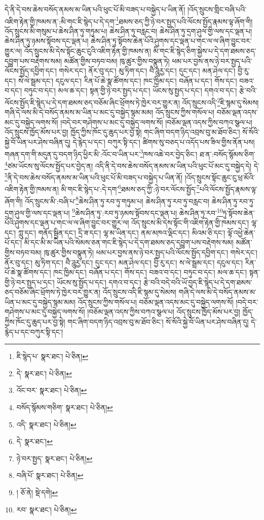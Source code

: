 དེ་ནི་དེ་བས་ཆེས་བསོད་ནམས་མ་ཡིན་པའི་ཕུང་པོ་མི་བཟད་པ་བསྐྱེད་པ་ཡིན་ནོ། །འོད་སྲུངས་གླིང་བཞི་པའི་འཇིག་རྟེན་གྱི་ཁམས་ན་:མི་གང་ཇི་སྙེད་པ་དེ་དག་\footnote{ཇི་སྙེད་པ་  སྣར་ཐང་།  པེ་ཅིན། }ཐམས་ཅད་ཀྱི་ཉེ་བར་སྤྱད་པའི་ལོངས་སྤྱོད་རྣམས་ལྟ་ཞོག་གི། འོད་སྲུངས་མི་གསུམ་པ་ཆེས་ཤིན་ཏུ་གཏུམ་པ། ཆེས་ཤིན་ཏུ་བརླང་བ། ཆེས་ཤིན་ཏུ་དྲག་ཤུལ་གྱི་ལས་དང་ལྡན་པ། ཆེས་ཤིན་ཏུ་ཉམས་སྟོབས་དང་ལྡན་པ། ཆེས་ཤིན་ཏུ་སྟོབས་ཆེན་པོའི་ཤུགས་དང་ལྡན་པ་གང་ལ་ལ་ཞིག་བྱུང་བར་གྱུར་ལ། འོད་སྲུངས་མི་དེས་སྟོང་ཆུང་ངུའི་འཇིག་རྟེན་གྱི་ཁམས་ན། མི་གང་ཇི་སྙེད་ཅིག་སྐྱེས་པ་དེ་དག་ཐམས་ཅད་དབྱུག་པས་བརྡེགས་སམ། མཚོན་གྱིས་བཏབ་བམ། ཁུ་ཚུར་གྱིས་བསྣུན་ཏེ། ཕམ་པར་བྱས་ནས་ཉེ་བར་སྤྱད་པའི་ལོངས་སྤྱོད་དབྱིག་དང་། གསེར་དང་། ནོར་བུ་དང་། མུ་ཏིག་དང་། བཻ་ཌཱུརྱ་དང་། དུང་དང་། མན་ཤེལ་དང་། བྱི་རུ་དང་། སེ་ལེ་སྦྲམ་དང་། དངུལ་དང་། རིན་པོ་ཆེ་སྣ་ཚོགས་དང་། ཁང་ཁྱིམ་དང་། བཞོན་པ་དང་། གོས་དང་། བཟའ་བ་དང་། བཏུང་བ་དང་། མལ་ཆ་དང་། སྟན་གྱི་ཉེ་བར་སྤྱད་པ་དང་། ཡོངས་སུ་སྤྱད་པ་དང་། དགའ་བ་དང་། རྩེ་བའི་ལོངས་སྤྱོད་ཇི་སྙེད་པ་དེ་དག་ཐམས་ཅད་བཅོམ་ཞིང་ཕྲོགས་ཏེ་ཁྱེར་བར་གྱུར་ན། འོད་སྲུངས་འདི་\footnote{དེ་  སྣར་ཐང་།  པེ་ཅིན། }ཇི་སྙམ་དུ་སེམས། གཞི་དེ་ལས་མི་དེ་བསོད་ནམས་མ་ཡིན་པ་མང་དུ་བསྐྱེད་སྙམ་མམ། འོད་སྲུངས་ཀྱིས་གསོལ་པ། བཅོམ་ལྡན་འདས་མང་དུ་བསྐྱེད་ལགས་སོ། །བདེ་བར་གཤེགས་པ་མང་དུ་བསྐྱེད་ལགས་སོ། །བཅོམ་ལྡན་འདས་ཀྱིས་བཀའ་སྩལ་པ། འོད་སྲུངས་ཁྱོད་མོས་པར་བྱ། ཁྱོད་ཀྱིས་ཁོང་དུ་ཆུད་པར་བྱ་སྟེ། གང་ཞིག་བདག་ཉིད་འབྲས་བུ་མ་ཐོབ་ཅིང་། སོ་སོའི་སྐྱེ་བོ་ཡིན་པར་ཤེས་བཞིན་དུ། དེ་རྙེད་པ་དང་། བཀུར་སྟི་དང་། ཚིགས་སུ་བཅད་པ་འདོད་པས་ཟིལ་གྱིས་ནོན་པས། གཞན་དག་གི་མདུན་དུ་བདག་ཉིད་ཕྱིར་མི་:འོང་བ་ཡིན་པར་\footnote{འོང་བར་  སྣར་ཐང་།  པེ་ཅིན། }ཁས་འཆེ་བར་བྱེད་ཅིང་། ཐ་ན་:བསོད་སྙོམས་ཅིག་\footnote{བསོད་སྙོམས་གཅིག་  སྣར་ཐང་།  པེ་ཅིན། }ཙམ་ཡོངས་སུ་ལོངས་སྤྱོད་པར་བྱེད་ན། འདི་ནི་དེ་བས་ཆེས་བསོད་ནམས་མ་ཡིན་པའི་ཕུང་པོ་མང་དུ་བསྐྱེད་དེ། དེ་\footnote{འདི་  སྣར་ཐང་།  པེ་ཅིན། }ནི་དེ་བས་ཆེས་བསོད་ནམས་མ་ཡིན་པའི་ཕུང་པོ་མི་བཟད་པ་བསྐྱེད་པ་ཡིན་ནོ། །འོད་སྲུངས་སྟོང་ཆུང་ངུ་ཕྲ་མོའི་འཇིག་རྟེན་གྱི་ཁམས་ན། མི་གང་ཇི་སྙེད་པ་:དེ་དག་\footnote{དེ་  སྣར་ཐང་། }ཐམས་ཅད་ཀྱི་:ཉེ་བར་ལོངས་སྤྱོད་\footnote{ཉེ་བར་སྤྱད་  སྣར་ཐང་།  པེ་ཅིན། }པའི་ལོངས་སྤྱོད་རྣམས་ལྟ་ཞོག་གི། འོད་སྲུངས་མི་:བཞི་པ་\footnote{བཞི་པོ་  སྣར་ཐང་།  པེ་ཅིན། }ཆེས་ཤིན་ཏུ་རབ་ཏུ་གཏུམ་པ། ཆེས་ཤིན་ཏུ་རབ་ཏུ་བརླང་བ། ཆེས་ཤིན་ཏུ་རབ་ཏུ་དྲག་ཤུལ་གྱི་ལས་དང་ལྡན་པ། \footnote{།  ཅོ་ནེ།  སྡེ་དགེ། }ཆེས་ཤིན་ཏུ་:རབ་ཏུ་ཉམས་སྟོབས་དང་ལྡན་པ། ཆེས་ཤིན་ཏུ་རབ་\footnote{རབ་  སྣར་ཐང་།  པེ་ཅིན། }ཏུ་སྟོབས་ཆེན་པོའི་ཤུགས་དང་ལྡན་པ་གང་ལ་ལ་ཞིག་བྱུང་བར་གྱུར་ལ། འོད་སྲུངས་མི་དེས་སྟོང་གི་འཇིག་རྟེན་གྱི་ཁམས་དང་། ལྷ་དང་། ཀླུ་དང་། གནོད་སྦྱིན་དང་། དྲི་ཟ་དང་། ལྷ་མ་ཡིན་དང་། ནམ་མཁའ་ལྡིང་དང་། མིའམ་ཅི་དང་། ལྟོ་འཕྱེ་ཆེན་པོ་དང་། མི་དང་མི་མ་ཡིན་པའི་སེམས་ཅན་གང་ཇི་སྙེད་པ་དེ་དག་ཐམས་ཅད་དབྱུག་པས་བརྡེགས་སམ། མཚོན་གྱིས་བཏབ་བམ། ཁུ་ཚུར་གྱིས་བསྣུན་ཏེ། ཕམ་པར་བྱས་ནས་ཉེ་བར་སྤྱད་པའི་ལོངས་སྤྱོད་དབྱིག་དང་། གསེར་དང་། ནོར་བུ་དང་། མུ་ཏིག་དང་། བཻ་ཌཱུརྱ་དང་། དུང་དང་། མན་ཤེལ་དང་། བྱི་རུ་དང་། ས་ལེ་སྦྲམ་དང་། དངུལ་དང་། རིན་པོ་ཆེ་སྣ་ཚོགས་དང་། ཁང་ཁྱིམ་དང་། བཞོན་པ་དང་། གོས་དང་། བཟའ་བ་དང་། བཏུང་བ་དང་། མལ་ཆ་དང་། སྟན་གྱི་ཉེ་བར་སྤྱད་པ་དང་། ཡོངས་སུ་སྤྱོད་པ་དང་། དགའ་བ་དང་། རྩེ་བའི་བདེ་བའི་ཡོ་བྱད་ཇི་སྙེད་པ་དེ་དག་ཐམས་ཅད་བཅོམ་ཞིང་ཕྲོགས་ཏེ་ཁྱེར་བར་གྱུར་ན། འོད་སྲུངས་འདི་ཇི་སྙམ་དུ་སེམས། གཞི་དེ་ལས་མི་དེ་བསོད་ནམས་མ་ཡིན་པ་མང་དུ་བསྐྱེད་སྙམ་མམ། འོད་སྲུངས་ཀྱིས་གསོལ་པ། བཅོམ་ལྡན་འདས་མང་དུ་བསྐྱེད་ལགས་སོ། །བདེ་བར་གཤེགས་པ་མང་དུ་བསྐྱེད་ལགས་སོ། །བཅོམ་ལྡན་འདས་ཀྱིས་བཀའ་སྩལ་པ། འོད་སྲུངས་ཁྱོད་མོས་པར་བྱ། ཁྱོད་ཀྱིས་ཁོང་དུ་ཆུད་པར་བྱ་སྟེ། གང་ཞིག་བདག་ཉིད་འབྲས་བུ་མ་ཐོབ་ཅིང་། སོ་སོའི་སྐྱེ་བོ་ཡིན་པར་ཤེས་བཞིན་དུ། དེ་རྙེད་པ་དང་བཀུར་སྟི་དང་། 